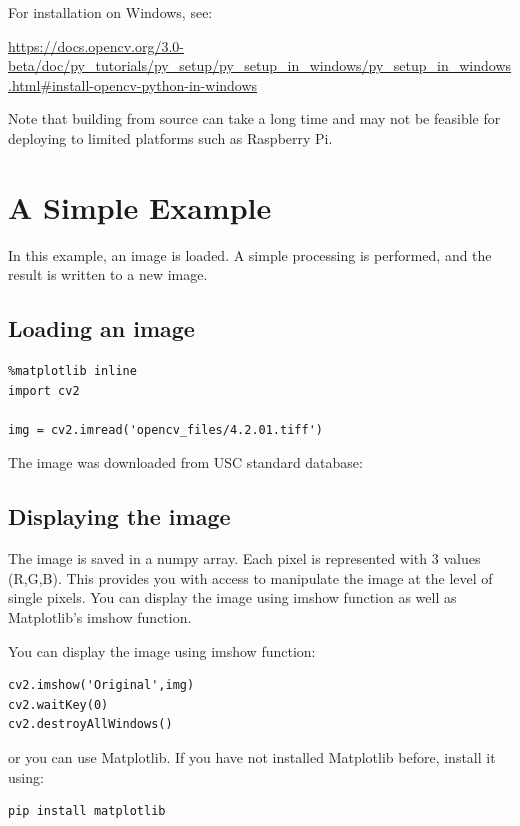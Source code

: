 For installation on Windows, see:

  \url{https://docs.opencv.org/3.0-beta/doc/py_tutorials/py_setup/py_setup_in_windows/py_setup_in_windows.html#install-opencv-python-in-windows}

Note that building from source can take a long time and may not be
feasible for deploying to limited platforms such as Raspberry Pi.

\section{A Simple Example}\label{a-simple-example}

In this example, an image is loaded. A simple processing is performed,
and the result is written to a new image.

\subsection{Loading an image}\label{loading-an-image}

\begin{verbatim}
%matplotlib inline
import cv2

img = cv2.imread('opencv_files/4.2.01.tiff') 
\end{verbatim}

The image was downloaded from USC standard database:


\subsection{Displaying the image}\label{displaying-the-image}

The image is saved in a numpy array. Each pixel is represented with 3
values (R,G,B). This provides you with access to manipulate the image at
the level of single pixels. You can display the image using imshow
function as well as Matplotlib's imshow function.

You can display the image using imshow function:

\begin{verbatim}
cv2.imshow('Original',img)
cv2.waitKey(0)
cv2.destroyAllWindows()
\end{verbatim}

or you can use Matplotlib. If you have not installed Matplotlib before,
install it using:

\begin{verbatim}
pip install matplotlib
\end{verbatim}

